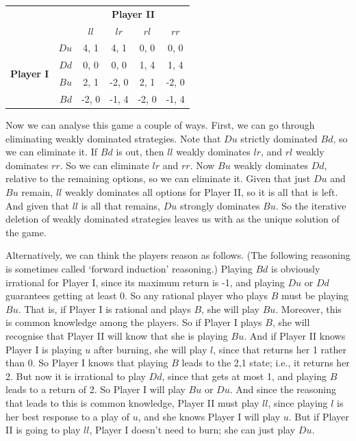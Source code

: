 \documentclass[openany]{book}
\begin{document}
\begin{center}
\begin{tabular}{l r | c c c c}
& & \multicolumn{4}{c}{\textbf{Player II}} \\
& & $ll$ & $lr$ & $rl$ & $rr$ \\ \hline
\multirow{4}{*}{\textbf{Player I}}
& $Du$ & 4, 1 & 4, 1 & 0, 0 & 0, 0\\
& $Dd$ & 0, 0 & 0, 0 & 1, 4 & 1, 4\\
& $Bu$ & 2, 1 & -2, 0 & 2, 1 & -2, 0\\
& $Bd$ & -2, 0 & -1, 4 & -2, 0 & -1, 4
\end{tabular}
\end{center}
Now we can analyse this game a couple of ways. First, we can go through eliminating weakly dominated strategies. Note that $Du$ strictly dominated $Bd$, so we can eliminate it. If $Bd$ is out, then $ll$ weakly dominates $lr$, and $rl$ weakly dominates $rr$. So we can eliminate $lr$ and $rr$. Now $Bu$ weakly dominates $Dd$, relative to the remaining options, so we can eliminate it. Given that just $Du$ and $Bu$ remain, $ll$ weakly dominates all options for Player II, so it is all that is left. And given that $ll$ is all that remains, $Du$ strongly dominates $Bu$. So the iterative deletion of weakly dominated strategies leaves us with  as the unique solution of the game.

Alternatively, we can think the players reason as follows. (The following reasoning is sometimes called `forward induction' reasoning.) Playing $Bd$ is obviously irrational for Player I, since its maximum return is -1, and playing $Du$ or $Dd$ guarantees getting at least 0. So any rational player who plays $B$ must be playing $Bu$. That is, if Player I is rational and plays $B$, she will play $Bu$. Moreover, this is common knowledge among the players. So if Player I plays $B$, she will recognise that Player II will know that she is playing $Bu$. And if Player II knows Player I is playing $u$ after burning, she will play $l$, since that returns her 1 rather than 0. So Player I knows that playing $B$ leads to the 2,1 state; i.e., it returns her 2. But now it is irrational to play $Dd$, since that gets at most 1, and playing $B$ leads to a return of 2. So Player I will play $Bu$ or $Du$. And since the reasoning that leads to this is common knowledge, Player II must play $ll$, since playing $l$ is her best response to a play of $u$, and she knows Player I will play $u$. But if Player II is going to play $ll$, Player I doesn't need to burn; she can just play $Du$.
\end{document}
